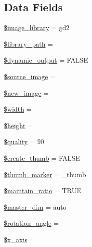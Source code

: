 \subsection*{Data Fields}
\begin{DoxyCompactItemize}
\item 
\hyperlink{class_c_i___image__lib_ac4b224358e1169eec8db344bcb3186c0}{\$image\+\_\+library} = \textquotesingle{}gd2\textquotesingle{}
\item 
\hyperlink{class_c_i___image__lib_ac09f7fc802884aae2149f1df0e53f17a}{\$library\+\_\+path} = \textquotesingle{}\textquotesingle{}
\item 
\hyperlink{class_c_i___image__lib_ad90737913d82776e7d3a7dfaef68e167}{\$dynamic\+\_\+output} = F\+A\+L\+S\+E
\item 
\hyperlink{class_c_i___image__lib_a54fc395722d5e9f15d656d22ba84e382}{\$source\+\_\+image} = \textquotesingle{}\textquotesingle{}
\item 
\hyperlink{class_c_i___image__lib_a6147ac30032312f2b42a9b05618faf12}{\$new\+\_\+image} = \textquotesingle{}\textquotesingle{}
\item 
\hyperlink{class_c_i___image__lib_a5795120b4b324bc4ca83f1e6fdce7d57}{\$width} = \textquotesingle{}\textquotesingle{}
\item 
\hyperlink{class_c_i___image__lib_a2c265bba1724371bb03e6901297c30b2}{\$height} = \textquotesingle{}\textquotesingle{}
\item 
\hyperlink{class_c_i___image__lib_a0e342ea32cccdc2c932ad23b9796a62a}{\$quality} = 90
\item 
\hyperlink{class_c_i___image__lib_ab1250903cbadaaadb42ec188d38ab398}{\$create\+\_\+thumb} = F\+A\+L\+S\+E
\item 
\hyperlink{class_c_i___image__lib_a3176700c651c0c3cd8cfa186ba03302a}{\$thumb\+\_\+marker} = \textquotesingle{}\+\_\+thumb\textquotesingle{}
\item 
\hyperlink{class_c_i___image__lib_a7fe1beb3e7d60245c97c60ee4b668d93}{\$maintain\+\_\+ratio} = T\+R\+U\+E
\item 
\hyperlink{class_c_i___image__lib_ae86c3d7ce316cc0c48a8dcba8ae4130d}{\$master\+\_\+dim} = \textquotesingle{}auto\textquotesingle{}
\item 
\hyperlink{class_c_i___image__lib_a9410d2e216c0c1dd852031f2a39e7ec7}{\$rotation\+\_\+angle} = \textquotesingle{}\textquotesingle{}
\item 
\hyperlink{class_c_i___image__lib_a128914b11765a500690f876962196ca6}{\$x\+\_\+axis} = \textquotesingle{}\textquotesingle{}
\item 

\end{DoxyCompactItemize}
